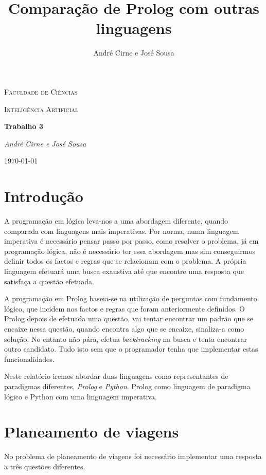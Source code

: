 \documentclass[12pt,a4paper]{article}
\author{André Cirne e José Sousa}
\title{Comparação de Prolog com outras linguagens}
\begin{document}
\begin{titlepage}
	\centering
	{\scshape\LARGE Faculdade de Ciências \par}
	\vspace{1cm}
	{\scshape\Large Inteligência Artificial\par}
	\vspace{1.5cm}
	{\huge\bfseries Trabalho 3\par}
	\vspace{2cm}
	{\Large\itshape André Cirne e José Sousa\par}
	\vfill

	{\large \today\par}
\end{titlepage}

\tableofcontents
\section{Introdução}
A programação em lógica leva-nos a uma abordagem diferente, quando comparada com linguagens mais imperativas. Por norma, numa linguagem imperativa é necessário pensar passo por passo, como resolver o problema, já em programação lógica, não é necessário ter essa abordagem mas sim conseguirmos definir todos os factos e regras que se relacionam com o problema. A própria linguagem efetuará uma busca exaustiva até que encontre uma resposta que satisfaça a questão efetuada\cite{pires2013prolog}.

A programação em Prolog baseia-se na utilização de perguntas com fundamento lógico, que incidem nos factos e regras que foram anteriormente definidos. O Prolog depois de efetuada uma questão, vai tentar encontrar um padrão que se encaixe nessa questão, quando encontra algo que se encaixe, sinaliza-a como solução. No entanto não pára, efetua \textit{backtracking} na busca e tenta encontrar outro candidato. Tudo isto sem que o programador tenha que implementar estas funcionalidades\cite{merritt1992prolog}.

Neste relatório iremos abordar duas linguagens como representantes de paradigmas diferentes, \textit{Prolog} e \textit{Python}. Prolog como linguagem de paradigma lógico e Python com uma linguagem imperativa.

\section{Planeamento de viagens}
No problema de planeamento de viagens foi necessário implementar uma resposta a três questões diferentes. 
\end{document}
